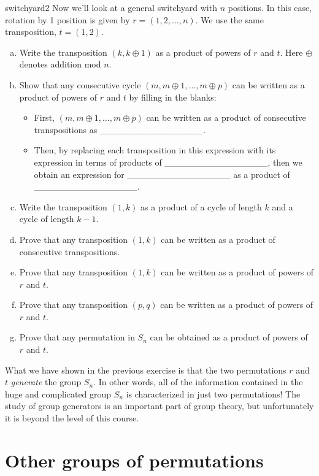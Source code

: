 \begin{exercise}{switchyard2}
Now we'll look at a general switchyard with $n$ positions. In this case, rotation by 1 position is given by  $r= (1,2,\ldots,n)$. We  use the same transposition, $t = (1,2)$.
\begin{enumerate}[(a)]
\item
Write the transposition $(k,k\oplus 1)$ as a product of powers of $r$ and $t$. Here $\oplus$ denotes addition mod $n$.
\item
Show that any consecutive cycle $(m,m\oplus 1,\ldots,m \oplus  p )$ can be written as a product of powers of $r$ and $t$ by filling in the blanks:

\begin{itemize}
\item
First, $(m,m \oplus 1,\ldots,m \oplus  p )$ can be written as a product of consecutive transpositions as \_\_\_\_\_\_\_\_\_\_\_\_\_\_\_\_.
\item
Then, by replacing each transposition in this expression with its expression in terms of  products of \_\_\_\_\_\_\_\_\_\_\_\_\_\_\_\_, then we obtain an expression for \_\_\_\_\_\_\_\_\_\_\_\_\_\_\_\_ as a product of \_\_\_\_\_\_\_\_\_\_\_\_\_\_\_\_.
\end{itemize}

\item
Write the transposition $(1,k)$ as a product of a cycle of length $k$ and a cycle of length $k-1$. 
\item
Prove that any transposition $(1,k)$ can be written as a product of consecutive transpositions.
\item
Prove that any transposition $(1,k)$ can be written as a product of powers of $r$ and $t$.
\item
Prove that any transposition $(p,q)$ can be written as a product of powers of $r$ and $t$.
\item
Prove that any permutation in $S_n$ can be obtained as a product of powers of $r$ and $t$.
\end{enumerate}
\end{exercise}
What we have shown in the previous exercise is that the two permutations $r$ and $t$ \emph{generate} the group $S_n$. In other words, all of the information contained in the huge and complicated group $S_n$ is characterized in just two permutations! The study of group generators is an important part of group theory, but unfortunately it is beyond the level of this course.  


\section{Other groups of permutations }
